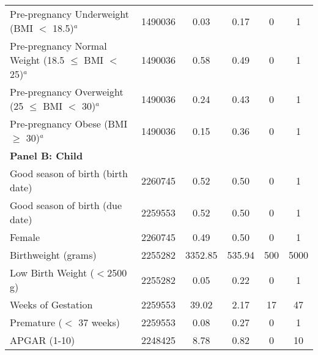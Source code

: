 \documentclass[10pt,letterpaper,subeqn]{beamer}
\begin{document}
\begin{frame}
\begin{table}[htpb!]
\begin{center}
{\begin{tabular}{lccccc}
Pre-pregnancy Underweight (BMI $<$ 18.5)$^{a}$&     1490036&        0.03&        0.17&           0&           1\\

Pre-pregnancy Normal Weight (18.5 $\leq$ BMI $<$ 25)$^{a}$&     1490036&        0.58&        0.49&           0&           1\\

Pre-pregnancy Overweight (25 $\leq$ BMI $<$ 30)$^{a}$&     1490036&        0.24&        0.43&           0&           1\\

Pre-pregnancy Obese (BMI $\geq$ 30)$^{a}$&     1490036&        0.15&        0.36&           0&           1\\


 \multicolumn{6}{l}{\textbf{Panel B: Child}}\\
 Good season of birth (birth date)&     2260745&        0.52&        0.50&           0&           1\\
Good season of birth (due date)&     2259553&        0.52&        0.50&           0&           1\\
Female              &     2260745&        0.49&        0.50&           0&           1\\
Birthweight (grams) &     2255282&     3352.85&      535.94&         500&        5000\\
Low Birth Weight ($<$2500 g)&     2255282&        0.05&        0.22&           0&           1\\
Weeks of Gestation  &     2259553&       39.02&        2.17&          17&          47\\
Premature ($<$ 37 weeks)&     2259553&        0.08&        0.27&           0&           1\\
APGAR (1-10)        &     2248425&        8.78&        0.82&           0&          10\\

\bottomrule
 \end{tabular}}
\end{center}\end{table}
\end{frame}
\end{document}
